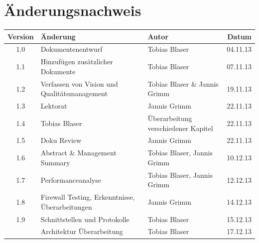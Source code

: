 




\chapter*{Änderungsnachweis}
\begin{tabularx}{\textwidth}{|cXlr|} %
		\hline
		\textbf{Version} & \textbf{Änderung} & \textbf{Autor} & \textbf{Datum}\\
		\hline
		1.0 & Dokumentenentwurf & Tobias Blaser & 04.11.13\\
		1.1 & Hinzufügen zusätzlicher Dokumente & Tobias Blaser & 07.11.13\\
		1.2 & Verfassen von Vision und Qualitätsmanagement & Tobias Blaser \& Jannis Grimm & 19.11.13\\
		1.3 & Lektorat & Jannis Grimm & 22.11.13\\
		1.4 & Tobias Blaser & Überarbeitung verschiedener Kapitel & 22.11.13\\
		1.5 & Doku Review & Jannis Grimm & 22.11.13\\
		1.6 & Abstract \& Management Summary & Tobias Blaser, Jannis Grimm & 10.12.13\\
		1.7 & Performanceanalyse & Tobias Blaser, Jannis Grimm & 12.12.13\\
		1.8 & Firewall Testing, Erkenntnisse, Überarbeitungen & Jannis
		Grimm & 14.12.13\\
		1.9 & Schnittstellen und Protokolle & Tobias Blaser & 15.12.13\\
		\versionnumber & Architektur Überarbeitung & Tobias Blaser & 17.12.13\\
		\hline
\end{tabularx}

\tableofcontents
















